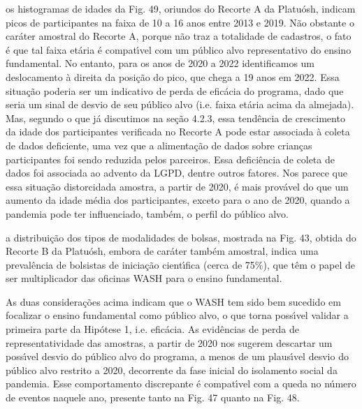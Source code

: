 \documentclass[
12pt,		%
openright,	%
twoside,  %
a4paper,			%
chapter=TITLE,		%
english,			%
french,				%
spanish,			%
brazil				%
]{USPSC-classe/USPSC}
\begin{document}
\begin{alineas}
\item os histogramas de idades da Fig. 49, oriundos do Recorte A da Platu\'osh, indicam picos de participantes na faixa de 10 a 16 anos entre  2013 e 2019. N\~ao obstante o car\'ater amostral do Recorte A, porque n\~ao traz a totalidade de cadastros, o fato \'e que tal faixa et\'aria \'e compat\'{\i}vel com um p\'ublico alvo representativo do ensino fundamental. No entanto, para os anos de 2020 a 2022 identificamos um deslocamento \`a direita da posi\c{c}\~ao do pico, que chega a 19 anos em 2022. Essa situa\c{c}\~ao poderia ser um indicativo de perda de efic\'acia do programa, dado que seria um sinal de desvio de seu p\'ublico alvo (i.e. faixa et\'aria acima da almejada). Mas, segundo o que j\'a discutimos na se\c{c}\~ao 4.2.3, essa tend\^encia de crescimento da idade dos participantes verificada no Recorte A pode estar associada \`a coleta de dados deficiente, uma vez que a alimenta\c{c}\~ao de dados sobre crian\c{c}as participantes foi sendo reduzida pelos parceiros. Essa defici\^encia de coleta de dados foi associada ao advento da LGPD, dentre outros fatores.  Nos parece que essa situa\c{c}\~ao \textquotedbl distorcida\textquotedbl   da amostra, a partir de 2020, \'e  mais prov\'avel do que um aumento da idade m\'edia dos participantes, exceto para o ano de 2020, quando a pandemia pode ter influenciado, tamb\'em, o perfil do p\'ublico alvo.
\item a distribui\c{c}\~ao dos tipos de modalidades de bolsas, mostrada na Fig. 43, obtida do Recorte B da Platu\'osh, embora de car\'ater tamb\'em amostral, indica uma preval\^encia de bolsistas de inicia\c{c}\~ao cient\'{\i}fica (cerca de 75\%), que t\^em o papel de ser  multiplicador das oficinas WASH para o ensino fundamental.
\end{alineas}

As duas considera\c{c}\~oes acima indicam que o WASH tem sido bem sucedido em focalizar o ensino fundamental como p\'ublico alvo, o que torna poss\'{\i}vel validar a primeira parte da Hip\'otese 1, i.e. efic\'acia. As evid\^encias de perda de representatividade das amostras, a partir de 2020 nos sugerem descartar um poss\'{\i}vel desvio do p\'ublico alvo do programa, a menos de um plaus\'{\i}vel desvio do p\'ublico alvo restrito a 2020, decorrente da fase inicial do isolamento social da pandemia. Esse comportamento discrepante \'e compat\'{\i}vel com a queda no n\'umero de eventos naquele ano, presente tanto na Fig. 47 quanto na Fig. 48.
\end{document}
